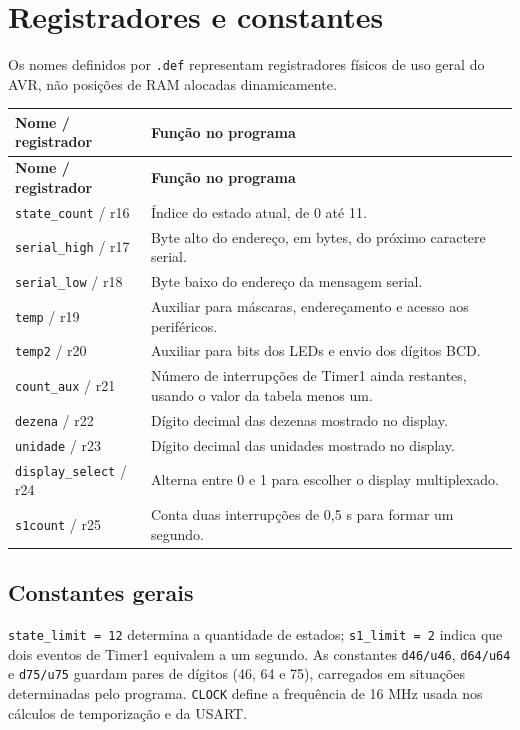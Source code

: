 \documentclass[12pt,a4paper]{article}
\newcommand{\reg}[1]{\texttt{#1}}
\begin{document}
\section{Registradores e constantes}
Os nomes definidos por \reg{.def} representam registradores físicos de uso geral do AVR, não posições de RAM alocadas dinamicamente.
\begin{longtable}{|>{\raggedright\arraybackslash}p{3.6cm}|>{\raggedright\arraybackslash}p{9.1cm}|}
\hline\textbf{Nome / registrador} & \textbf{Função no programa} \\ \hline
\endfirsthead
\hline\textbf{Nome / registrador} & \textbf{Função no programa} \\ \hline
\endhead
\reg{state\_count} / r16 & Índice do estado atual, de 0 até 11. \\ \hline
\reg{serial\_high} / r17 & Byte alto do endereço, em bytes, do próximo caractere serial. \\ \hline
\reg{serial\_low} / r18 & Byte baixo do endereço da mensagem serial. \\ \hline
\reg{temp} / r19 & Auxiliar para máscaras, endereçamento e acesso aos periféricos. \\ \hline
\reg{temp2} / r20 & Auxiliar para bits dos LEDs e envio dos dígitos BCD. \\ \hline
\reg{count\_aux} / r21 & Número de interrupções de Timer1 ainda restantes, usando o valor da tabela menos um. \\ \hline
\reg{dezena} / r22 & Dígito decimal das dezenas mostrado no display. \\ \hline
\reg{unidade} / r23 & Dígito decimal das unidades mostrado no display. \\ \hline
\reg{display\_select} / r24 & Alterna entre 0 e 1 para escolher o display multiplexado. \\ \hline
\reg{s1count} / r25 & Conta duas interrupções de 0,5 s para formar um segundo. \\ \hline
\end{longtable}

\subsection{Constantes gerais}
\reg{state\_limit = 12} determina a quantidade de estados; \reg{s1\_limit = 2} indica que dois eventos de Timer1 equivalem a um segundo. As constantes \reg{d46/u46}, \reg{d64/u64} e \reg{d75/u75} guardam pares de dígitos (46, 64 e 75), carregados em situações determinadas pelo programa. \reg{CLOCK} define a frequência de 16 MHz usada nos cálculos de temporização e da USART.
\end{document}
